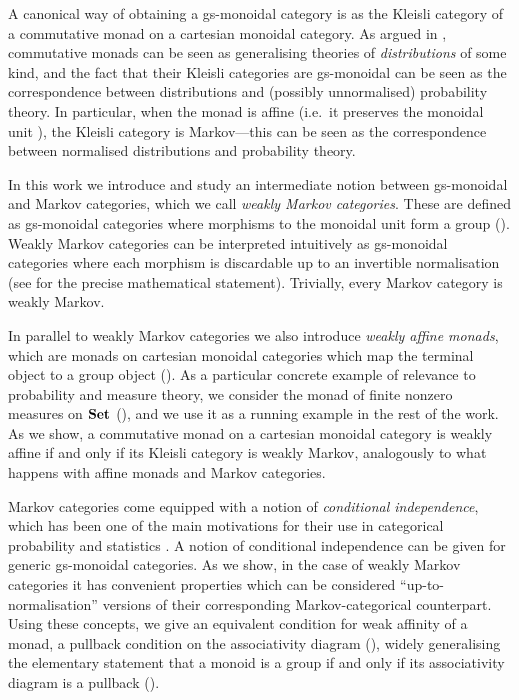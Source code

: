 \documentclass[a4paper,UKenglish,numberwithinsect,cleveref, autoref, thm-restate]{lipics-v2021}
\theoremstyle{plain} %
\theoremstyle{definition} %
\begin{document}
A canonical way of obtaining a gs-monoidal category is as the Kleisli category of a commutative monad on a cartesian monoidal category. 
As argued in \cite{kock2012distributions}, commutative monads can be seen as generalising theories of \emph{distributions} of some kind, and the fact that their Kleisli categories are gs-monoidal can be seen as the correspondence between distributions and (possibly unnormalised) probability theory.
In particular, when the monad is affine (i.e.~it preserves the monoidal unit \cite{Kock71,Jacobs1994}), the Kleisli category is Markov---this can be seen as the correspondence between normalised distributions and probability theory.

In this work we introduce and study an intermediate notion between gs-monoidal and Markov categories, which we call \emph{weakly Markov categories}. 
These are defined as gs-monoidal categories where morphisms to the monoidal unit form a group (). 
Weakly Markov categories can be interpreted intuitively as gs-monoidal categories where each morphism is discardable up to an invertible normalisation (see  for the precise mathematical statement). Trivially, every Markov category is weakly Markov.

In parallel to weakly Markov categories we also introduce \emph{weakly affine monads}, which are monads on cartesian monoidal categories which map the terminal object to a group object ().
As a particular concrete example of relevance to probability and measure theory, we consider the monad of finite nonzero measures on $\mathbf{Set}$ (), and we use it as a running example in the rest of the work.
As we show, a commutative monad on a cartesian monoidal category is weakly affine if and only if its Kleisli category is weakly Markov, analogously to what happens with affine monads and Markov categories. 

Markov categories come equipped with a notion of \emph{conditional independence}, which has been one of the main motivations for their use in categorical probability and statistics \cite{cho_jacobs_2019,Fritz_2020,fritz2022dseparation}.
A notion of conditional independence can be given for generic gs-monoidal categories. As we show, in the case of weakly Markov categories it has convenient properties which can be considered ``up-to-normalisation'' versions of their corresponding Markov-categorical counterpart.
Using these concepts, we give an equivalent condition for weak affinity of a monad, a pullback condition on the associativity diagram (), widely generalising the elementary statement that a monoid is a group if and only if its associativity diagram is a pullback (). 
\end{document}
